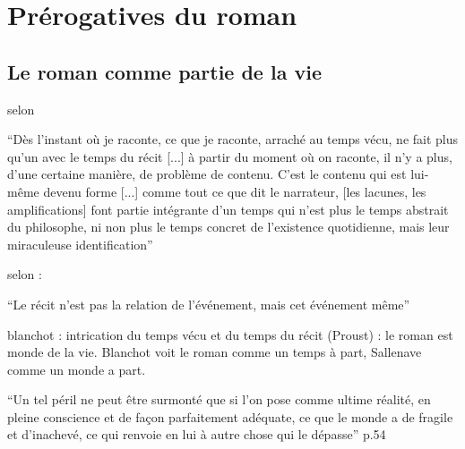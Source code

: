 \documentclass[a4paper,10pt]{article}
\begin{document}
	\section{Prérogatives du roman}
		\subsection{Le roman comme partie de la vie}
			selon \cite{Pingaud1992}
			\begin{center}
				\footnotesize
				\begin{minipage}{0.7\textwidth}
					``Dès l'instant où je raconte, ce que je raconte, arraché au temps vécu, ne fait plus qu'un avec le temps du récit [...] à partir du moment où on raconte, il n'y a plus, d'une certaine manière, de problème de contenu. C'est le contenu qui est lui-même devenu forme [...] comme tout ce que dit le narrateur, [les lacunes, les amplifications] font partie intégrante d'un temps qui n'est plus le temps abstrait du philosophe, ni non plus le temps concret de l'existence quotidienne, mais leur miraculeuse identification''
				\end{minipage}
			\end{center}
			selon \cite{Blanchot1959}:
			\begin{center}
				\footnotesize
				\begin{minipage}{0.7\textwidth}
					``Le récit n'est pas la relation de l'événement, mais cet événement même''
				\end{minipage}
			\end{center}
			blanchot : intrication du temps vécu et du temps du récit (Proust) : le roman est monde de la vie.
			Blanchot voit le roman comme un temps à part, Sallenave comme un monde a part.
			
			
			
			\cite{Lukacs191654}
			\begin{center}
				\footnotesize
				\begin{minipage}{0.7\textwidth}
					``Un tel péril ne peut être surmonté que si l'on pose comme ultime réalité, en pleine conscience et de façon parfaitement adéquate, ce que le monde a de fragile et d'inachevé, ce qui renvoie en lui à autre chose qui le dépasse'' p.54
				\end{minipage}
			\end{center}
\end{document}
